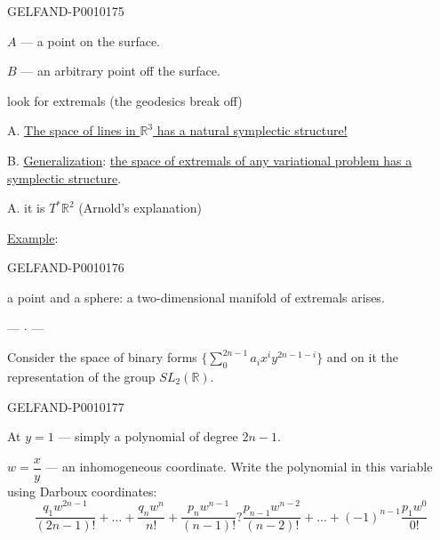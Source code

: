 \begin{GelfandAdjacentEvidence}{GELFAND-P001017}{5}


$A$ --- a point on the surface.

$B$ --- an arbitrary point off the surface.

look for extremals (the geodesics break off)

A. \underline{The space of lines in $\mathbb{R}^3$ has a natural symplectic structure!}

B. \underline{Generalization}: \underline{the space of extremals of any variational problem has a symplectic structure}.

A. it is $T^*\mathbb{R}^2$ (Arnold’s explanation)

\underline{Example}:

\end{GelfandAdjacentEvidence}
\begin{GelfandAdjacentEvidence}{GELFAND-P001017}{6}


a point and a sphere: a two-dimensional manifold of extremals arises.

\begin{center}--- $\cdot$ ---\end{center}
Consider the space of binary forms $\bigl\{\sum_0^{2n-1}a_i x^i y^{2n-1-i}\bigr\}$
and on it the representation of the group $SL_2(\mathbb{R})$.
\end{GelfandAdjacentEvidence}
\begin{GelfandAdjacentEvidence}{GELFAND-P001017}{7}

At $y=1$ --- simply a polynomial of degree $2n-1$.

$w=\dfrac{x}{y}$ --- an inhomogeneous coordinate.
Write the polynomial in this variable using Darboux coordinates:
\[
\frac{q_1w^{2n-1}}{(2n-1)!}+\ldots+\frac{q_nw^n}{n!}
+\frac{p_nw^{n-1}}{(n-1)!}\mathrel{\boxed{?}}
\frac{p_{n-1}w^{n-2}}{(n-2)!}+\ldots+(-1)^{n-1}\frac{p_1w^0}{0!}
\]
\end{GelfandAdjacentEvidence}



